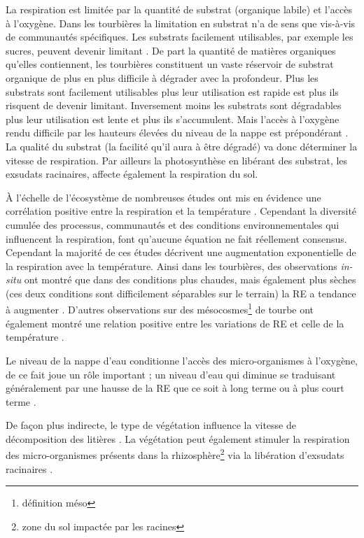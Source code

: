 La respiration est limitée par la quantité de substrat (organique labile) et l'accès à l'oxygène.
Dans les tourbières la limitation en substrat n'a de sens que vis-à-vis de communautés spécifiques.
Les substrats facilement utilisables, par exemple les sucres, peuvent devenir limitant \plop.
De part la quantité de matières organiques qu'elles contiennent, les tourbières constituent un vaste réservoir de substrat organique de plus en plus difficile à dégrader avec la profondeur.
Plus les substrats sont facilement utilisables plus leur utilisation est rapide est plus ils risquent de devenir limitant.
Inversement moins les substrats sont dégradables plus leur utilisation est lente et plus ils s'accumulent.
Mais l'accès à l'oxygène rendu difficile par les hauteurs élevées du niveau de la nappe est prépondérant \plop.
La qualité du substrat (la facilité qu'il aura à être dégradé) va donc déterminer la vitesse de respiration.
Par ailleurs la photosynthèse en libérant des substrat, les exsudats racinaires, affecte également la respiration du sol.

À l'échelle de l'écosystème de nombreuses études ont mis en évidence une corrélation positive entre la respiration et la température \citep{singh1977,raich1992,luo2006}.
Cependant la diversité cumulée des processus, communautés et des conditions environnementales qui influencent la respiration, font qu'aucune équation ne fait réellement consensus.
Cependant la majorité de ces études décrivent une augmentation exponentielle de la respiration avec la température.
Ainsi dans les tourbières, des observations \textit{in-situ} ont montré que dans des conditions plus chaudes, mais également plus sèches (ces deux conditions sont difficilement séparables sur le terrain) la RE a tendance à augmenter  \citep{aurela2007,cai2010,ward2013}.
D'autres observations sur des mésocosmes\footnote{définition méso} de tourbe ont également montré une relation positive entre les variations de RE et celle de la température \citep{updegraff2001,weedon2013}.

Le niveau de la nappe d'eau conditionne l'accès des micro-organismes à l'oxygène, de ce fait joue un rôle important ; un niveau d'eau qui diminue se traduisant généralement par une hausse de la RE que ce soit à long terme \citep{strack2006,ballantyne2014} ou à plus court terme \citep{aerts1997}.

De façon plus indirecte, le type de végétation influence la vitesse de décomposition des litières \citep{hobbie1996,liu2000,gogo2015}.
La végétation peut également stimuler la respiration des micro-organismes présents dans la rhizosphère\footnote{zone du sol impactée par les racines} via la libération d'exsudats racinaires \citep{moore2002}.

